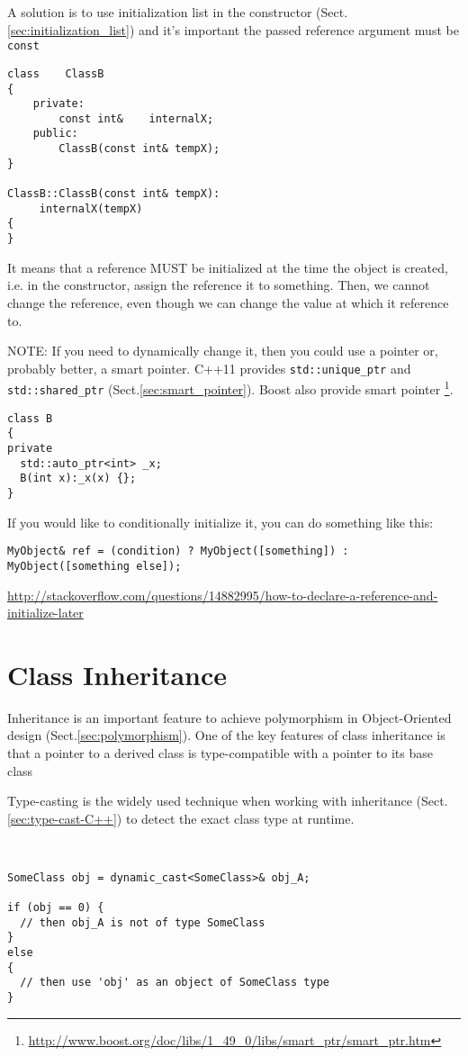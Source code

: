 A solution is to use initialization list in the constructor
(Sect.\ref{sec:initialization_list}) and it's important the passed
reference argument must be \verb!const!
\begin{lstlisting}
class    ClassB
{
    private:
        const int&    internalX;
    public:
        ClassB(const int& tempX);
}

ClassB::ClassB(const int& tempX):
     internalX(tempX)
{
}
\end{lstlisting}


It means that a reference MUST be initialized at the time the object is
created, i.e. in the constructor, assign the reference it to something. Then, we
cannot change the reference, even though we can change the value at which it
reference to. 

NOTE: If you need to dynamically change it, then you could use a pointer or,
probably better, a smart pointer. C++11 provides \verb!std::unique_ptr! and
\verb!std::shared_ptr! (Sect.\ref{sec:smart_pointer}). Boost also provide smart
pointer \footnote{\url{http://www.boost.org/doc/libs/1_49_0/libs/smart_ptr/smart_ptr.htm}}.

\begin{verbatim}
class B
{
private
  std::auto_ptr<int> _x;
  B(int x):_x(x) {};
}
\end{verbatim}

If you would like to conditionally initialize it, you can do something like
this:
\begin{verbatim}
MyObject& ref = (condition) ? MyObject([something]) : MyObject([something else]);
\end{verbatim}
\url{http://stackoverflow.com/questions/14882995/how-to-declare-a-reference-and-initialize-later}

\section{Class Inheritance}
\label{sec:OO_inheritance}

Inheritance is an important feature to achieve polymorphism in Object-Oriented
design (Sect.\ref{sec:polymorphism}).  One of the key features of class
inheritance is that a pointer to a derived class is type-compatible with a
pointer to its base class

Type-casting is the widely used technique when working with inheritance
(Sect.\ref{sec:type-cast-C++}) to detect the exact class type at runtime. 

\begin{lstlisting}


SomeClass obj = dynamic_cast<SomeClass>& obj_A;

if (obj == 0) {
  // then obj_A is not of type SomeClass 
}
else
{
  // then use 'obj' as an object of SomeClass type
}
\end{lstlisting}

